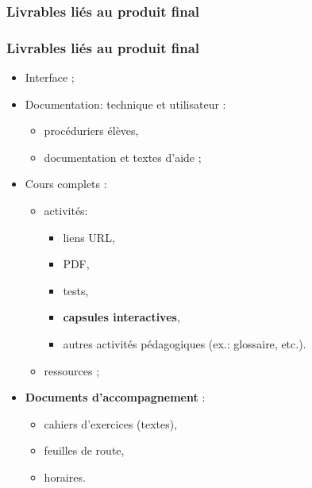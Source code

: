 					\subsubsection{Livrables liés au produit final} 
							\begin{frame}[allowframebreaks]
							\frametitle{Livrables liés au produit final}
                        			
							\begin{itemize}
							\item Interface ;
							\item Documentation: technique et utilisateur :
								\begin{itemize}
								\item procéduriers élèves,
								\item documentation et textes d’aide ;
								\end{itemize}
							\item Cours complets :
								\begin{itemize}
								\item activités:
									\begin{itemize}
									\item liens URL,
									\item PDF,
									\item tests,
									\item \textbf{capsules interactives},
									\item autres activités pédagogiques (ex.: glossaire, etc.).
									\end{itemize}
								\framebreak
								\item ressources ;
									
								\end{itemize}
							\item \textbf{Documents d'accompagnement} :
								\begin{itemize}
								\item cahiers d’exercices (textes),
								\item feuilles de route,
								\item horaires.
								\end{itemize}
							\end{itemize}						
					\end{frame}
					
